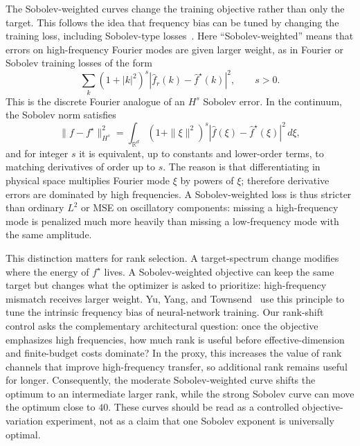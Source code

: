 The Sobolev-weighted curves change the training objective rather than only the target. This follows the idea that frequency bias can be tuned by changing the training loss, including Sobolev-type losses~\cite{yu2022tuning}. Here ``Sobolev-weighted'' means that errors on high-frequency Fourier modes are given larger weight, as in Fourier or Sobolev training losses of the form
\begin{equation}
\sum_{k}(1+|k|^2)^s
|\widehat f_r(k)-\widehat f^\star(k)|^2,
\qquad s>0 .
\end{equation}
This is the discrete Fourier analogue of an $H^s$ Sobolev error. In the continuum, the Sobolev norm satisfies
\begin{equation}
\|f-f^\star\|_{H^s}^2
=
\int_{\mathbb R^d}
(1+\|\xi\|^2)^s
|\widehat f(\xi)-\widehat f^\star(\xi)|^2\,d\xi ,
\end{equation}
and for integer $s$ it is equivalent, up to constants and lower-order terms, to matching derivatives of order up to $s$. The reason is that differentiating in physical space multiplies Fourier mode $\xi$ by powers of $\xi$; therefore derivative errors are dominated by high frequencies. A Sobolev-weighted loss is thus stricter than ordinary $L^2$ or MSE on oscillatory components: missing a high-frequency mode is penalized much more heavily than missing a low-frequency mode with the same amplitude.

This distinction matters for rank selection. A target-spectrum change modifies where the energy of $f^\star$ lives. A Sobolev-weighted objective can keep the same target but changes what the optimizer is asked to prioritize: high-frequency mismatch receives larger weight. Yu, Yang, and Townsend~\cite{yu2022tuning} use this principle to tune the intrinsic frequency bias of neural-network training. Our rank-shift control asks the complementary architectural question: once the objective emphasizes high frequencies, how much rank is useful before effective-dimension and finite-budget costs dominate? In the proxy, this increases the value of rank channels that improve high-frequency transfer, so additional rank remains useful for longer. Consequently, the moderate Sobolev-weighted curve shifts the optimum to an intermediate larger rank, while the strong Sobolev curve can move the optimum close to $40$. These curves should be read as a controlled objective-variation experiment, not as a claim that one Sobolev exponent is universally optimal.


